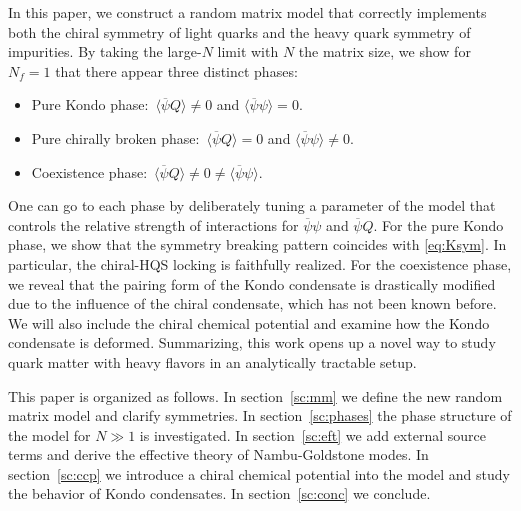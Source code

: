 \documentclass[aps,prd,longbibliography,reprint]{revtex4-2}
\renewcommand{\bar}[1]{\overline{#1}}
\newcommand{\1}{\mathbbm{1}}
\begin{document}
In this paper, we construct a random matrix model that correctly implements both the chiral symmetry of light quarks and the heavy quark symmetry of impurities. By taking the large-$N$ limit with $N$ the matrix size, we show for $N_f=1$ that there appear three distinct phases:
\begin{itemize}
	\setlength{\itemindent}{-12pt}
	\item Pure Kondo phase:~$\langle\bar\psi Q\rangle\ne 0$ and $\langle\bar\psi\psi\rangle=0$.
	\vspace{-5pt}
	\item Pure chirally broken phase:~$\langle\bar\psi Q\rangle=0$ and $\langle\bar\psi\psi\rangle\ne0$.
	\vspace{-5pt}
	\item Coexistence phase:~$\langle\bar\psi Q\rangle\ne 0 \ne \langle\bar\psi\psi\rangle$.
\end{itemize}
One can go to each phase by deliberately tuning a parameter of the model that controls the relative strength of interactions for $\bar\psi\psi$ and $\bar\psi Q$. For the pure Kondo phase, we show that the symmetry breaking pattern coincides with \eqref{eq:Ksym}. In particular, the chiral-HQS locking is faithfully realized. For the coexistence phase, we reveal that the pairing form of the Kondo condensate is drastically modified due to the influence of the chiral condensate, which has not been known before. We will also include the chiral chemical potential and examine how the Kondo condensate is deformed. Summarizing, this work opens up a novel way to study quark matter with heavy flavors in an analytically tractable setup. 

This paper is organized as follows. In section~\ref{sc:mm} we define the new random matrix model and clarify symmetries. In section~\ref{sc:phases} the phase structure of the model for $N\gg 1$ is investigated. In section~\ref{sc:eft} we add external source terms and derive the effective theory of Nambu-Goldstone modes. In section~\ref{sc:ccp} we introduce a chiral chemical potential into the model and study the behavior of Kondo condensates. In section~\ref{sc:conc} we conclude. 
\end{document}
